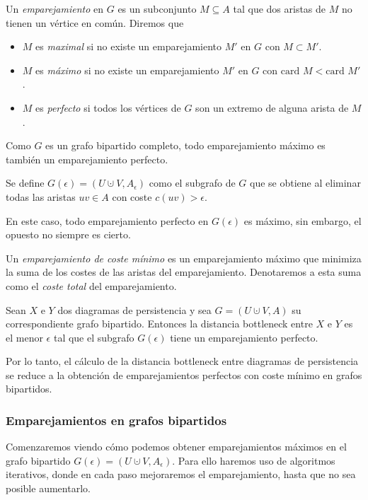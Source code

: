 \begin{definition}
Un \emph{emparejamiento} en $G$ es un subconjunto $M \subseteq A$ tal que dos aristas de $M$ no tienen un vértice en común. Diremos que
\begin{itemize}
	\item $M$ es \emph{maximal} si no existe un emparejamiento $M'$ en $G$ con $M \subset M'$.
	\item $M$ es \emph{máximo} si no existe un emparejamiento $M'$ en $G$ con $\text{card } M < \text{card } M'$.
	\item $M$ es \emph{perfecto} si todos los vértices de $G$ son un extremo de alguna arista de $M$.
\end{itemize}
\end{definition}

Como $G$ es un grafo bipartido completo, todo emparejamiento máximo es también un emparejamiento perfecto.

\begin{definition}
Se define $G(\epsilon)=(U \cupdot V, A_\epsilon)$ como el subgrafo de $G$ que se obtiene al eliminar todas las aristas $uv \in A$ con coste $c(uv)>\epsilon$.  
\end{definition}
En este caso, todo emparejamiento perfecto en $G(\epsilon)$ es máximo, sin embargo, el opuesto no siempre es cierto.

\begin{definition}
Un \emph{emparejamiento de coste mínimo} es un emparejamiento máximo que minimiza la suma de los costes de las aristas del emparejamiento. Denotaremos a esta suma como el \emph{coste total} del emparejamiento.
\end{definition}

\begin{lemma}
Sean $X$ e $Y$ dos diagramas de persistencia y sea $G =(U \cupdot V, A)$ su correspondiente grafo bipartido. Entonces la distancia bottleneck entre $X$ e $Y$ es el menor $\epsilon$ tal que el subgrafo $G(\epsilon)$ tiene un emparejamiento perfecto.
\end{lemma}

Por lo tanto, el cálculo de la distancia bottleneck entre diagramas de persistencia se reduce a la obtención de emparejamientos perfectos con coste mínimo en grafos bipartidos.

\subsubsection*{Emparejamientos en grafos bipartidos}
Comenzaremos viendo cómo podemos obtener emparejamientos máximos en el grafo bipartido $G(\epsilon)=(U \cupdot V, A_\epsilon)$. Para ello haremos uso de algoritmos iterativos, donde en cada paso mejoraremos el emparejamiento, hasta que no sea posible aumentarlo.

